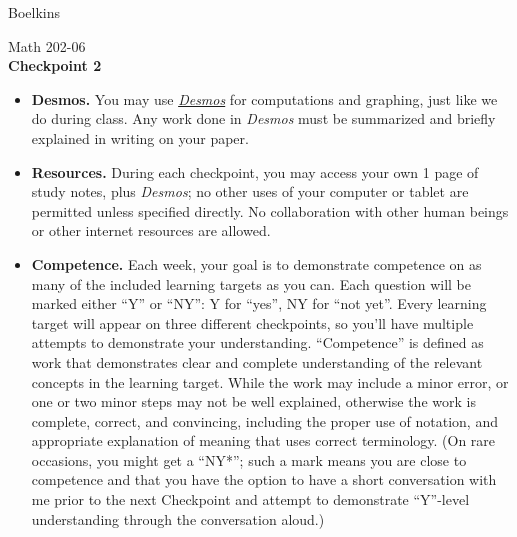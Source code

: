 \documentclass[11 pt]{article}
\begin{document}
 \hfill Boelkins \\
 
\begin{center}
Math 202-06 \\
{\bf Checkpoint 2}
\end{center}



\begin{itemize}
	
	\item {\bf Desmos.} You may use \href{https://www.desmos.com/calculator}{\emph{Desmos}} for computations and graphing, just like we do during class.  Any work done in \emph{Desmos} must be summarized and briefly explained in writing on your paper.  
	
	\item {\bf Resources.} During each checkpoint, you may access your own 1 page of study notes, plus \emph{Desmos}; no other uses of your computer or tablet are permitted unless specified directly.  No collaboration with other human beings or other internet resources are allowed.
	
	
	\item {\bf Competence.} Each week, your goal is to demonstrate competence on as many of the included learning targets as you can.  Each question will be marked either ``Y'' or ``NY'': Y for ``yes'', NY for ``not yet''.  Every learning target will appear on three different checkpoints, so you'll have multiple attempts to demonstrate your understanding.  ``Competence'' is defined as work that demonstrates clear and complete understanding of the relevant concepts in the learning target. While the work may include a minor error, or one or two minor steps may not be well explained, otherwise the work is complete, correct, and convincing, including the proper use of notation, and appropriate explanation of meaning that uses correct terminology.  (On rare occasions, you might get a ``NY*''; such a mark means you are close to competence and that you have the option to have a short conversation with me prior to the next Checkpoint and attempt to demonstrate ``Y''-level understanding through the conversation aloud.)	
\end{itemize}

\noindent \hrulefill \\
\end{document}
